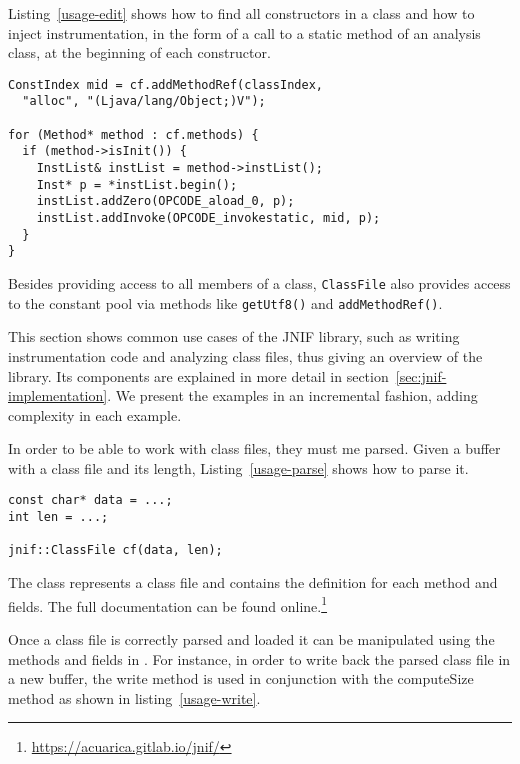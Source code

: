 Listing~\ref{usage-edit} shows how to find all constructors in a class
and how to inject instrumentation, in the form of a call to a static method
 of an analysis class,
at the beginning of each constructor.

\begin{lstlisting}[caption=Instrumenting constructor entries,label=usage-edit]
ConstIndex mid = cf.addMethodRef(classIndex, 
  "alloc", "(Ljava/lang/Object;)V");

for (Method* method : cf.methods) {
  if (method->isInit()) {
    InstList& instList = method->instList();
    Inst* p = *instList.begin();
    instList.addZero(OPCODE_aload_0, p);
    instList.addInvoke(OPCODE_invokestatic, mid, p);
  }
}
\end{lstlisting}

Besides providing access to all members of a class,
\texttt{ClassFile} also provides access to the constant pool
via methods like \texttt{getUtf8()} and \texttt{addMethodRef()}.



This section shows common use cases of the JNIF library, 
such as writing instrumentation code and analyzing class files, 
thus giving an overview of the library. 
Its components are explained in more detail in section~\ref{sec:jnif-implementation}.
We present the examples in an incremental fashion, adding complexity in each example.

In order to be able to work with class files, they must me parsed. 
Given a buffer with a class file and its length, Listing~\ref{usage-parse} shows how to parse it.

\begin{lstlisting}[caption=Decoding a class,label=usage-parse]
const char* data = ...;
int len = ...;

jnif::ClassFile cf(data, len);
\end{lstlisting}

The class  represents a \java{} class file and contains the definition for each method and fields. 
The full documentation can be found online.\footnote{\url{https://acuarica.gitlab.io/jnif/}}

Once a class file is correctly parsed and loaded it can be manipulated using the methods and fields in .
For instance, in order to write back the parsed class file in a new buffer, the write method is used in conjunction with the computeSize method as shown in listing~\ref{usage-write}.

